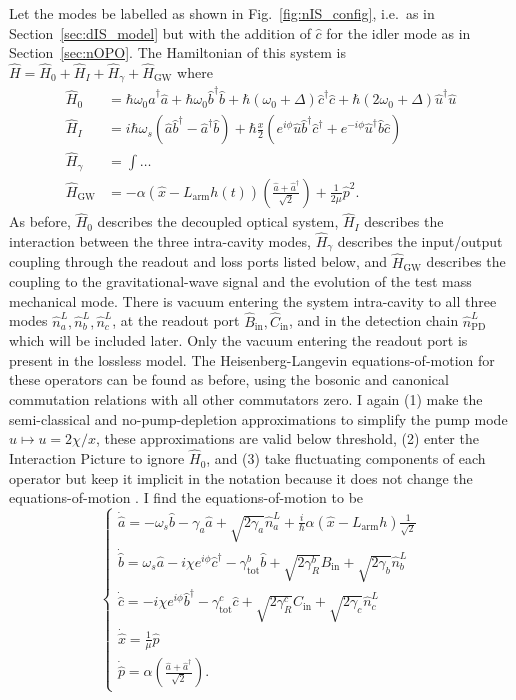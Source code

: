 Let the modes be labelled as shown in Fig.~\ref{fig:nIS_config}, i.e.\ as in Section~\ref{sec:dIS_model} but with the addition of $\hat c$ for the idler mode as in Section~\ref{sec:nOPO}. The Hamiltonian of this system is $\hat H = \hat H_0 + \hat H_I + \hat H_\gamma + \hat H_\text{GW}$ where~\cite{} 
\begin{align}
\hat H_0 &= \hbar \omega_0 \hat a^\dag \hat a + \hbar \omega_0 \hat b^\dag \hat b+ \hbar (\omega_0+\Delta) \hat c^\dag \hat c + \hbar (2\omega_0+\Delta) \hat u^\dag \hat u\\
\hat H_I &= i\hbar\omega_s(\hat a\hat b^\dag-\hat a^\dag\hat b) + \hbar \frac{x}{2} (e^{i\phi} \hat u \hat b^\dag \hat c^\dag+e^{-i\phi} \hat u^\dag \hat b \hat c) \\
\hat H_\gamma &= \int \ldots \\
\hat H_\text{GW} &= -\alpha (\hat{x}-L_\mathrm{arm}h(t))\left(\frac{\hat{a}+\hat{a}^\dag}{\sqrt{2}}\right)+\frac{1}{2\mu}\hat{p}^2.
\end{align}
As before, $\hat H_0$ describes the decoupled optical system, $\hat H_I$ describes the interaction between the three intra-cavity modes, $\hat H_\gamma$ describes the input/output coupling through the readout and loss ports listed below, and $\hat H_\text{GW}$ describes the coupling to the gravitational-wave signal and the evolution of the test mass mechanical mode.
There is vacuum entering the system intra-cavity to all three modes $\hat n^L_a, \hat n^L_b, \hat n^L_c$, at the readout port $\hat B_\text{in}, \hat C_\text{in}$, and in the detection chain $\hat n^L_\text{PD}$ which will be included later. Only the vacuum entering the readout port is present in the lossless model.
The Heisenberg-Langevin equations-of-motion for these operators can be found as before, using the bosonic and canonical commutation relations with all other commutators zero. I again (1) make the semi-classical and no-pump-depletion approximations to simplify the pump mode $\hat u\mapsto u=2\chi/x$, these approximations are valid below threshold, (2) enter the Interaction Picture to ignore $\hat H_0$, and (3) take fluctuating components of each operator but keep it implicit in the notation because it does not change the equations-of-motion . I find the equations-of-motion to be
\begin{equation}\label{eq:nIS_EoM}
\begin{cases}
\dot{\hat{a}}=-\omega_s\hat{b} - \gamma_a \hat{a} + \sqrt{2\gamma_a}\hat{n}^L_a+\frac{i}{\hbar}\alpha(\hat{x}-L_\mathrm{arm}h)\frac{1}{\sqrt{2}}\\
\dot{\hat{b}}=\omega_s\hat{a} - i\chi e^{i\phi}\hat{c}^\dagger - \gamma^b_\mathrm{tot} \hat{b} + \sqrt{2\gamma^b_R}\hat{B}_\mathrm{in} + \sqrt{2\gamma_b}\hat{n}^L_b\\
\dot{\hat{c}}=-i\chi e^{i\phi}\hat{b}^\dagger - \gamma^c_\mathrm{tot} \hat{c} + \sqrt{2\gamma^c_R}\hat{C}_\mathrm{in} + \sqrt{2\gamma_c}\hat{n}^L_c\\
\dot{\hat{x}}=\frac{1}{\mu}\hat{p}\\
\dot{\hat{p}}=\alpha\left(\frac{\hat{a}+\hat{a}^\dag}{\sqrt{2}}\right).
\end{cases}
\end{equation}
